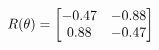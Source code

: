 \documentclass[preview]{standalone}
\begin{document}
\begin{align*}
\special{dvisvgm:raw <g id='unique000'>}R(\theta) = \begin{bmatrix}-0.47 & -0.88\\0.88 & -0.47\end{bmatrix}\special{dvisvgm:raw </g>}
\end{align*}
\end{document}
